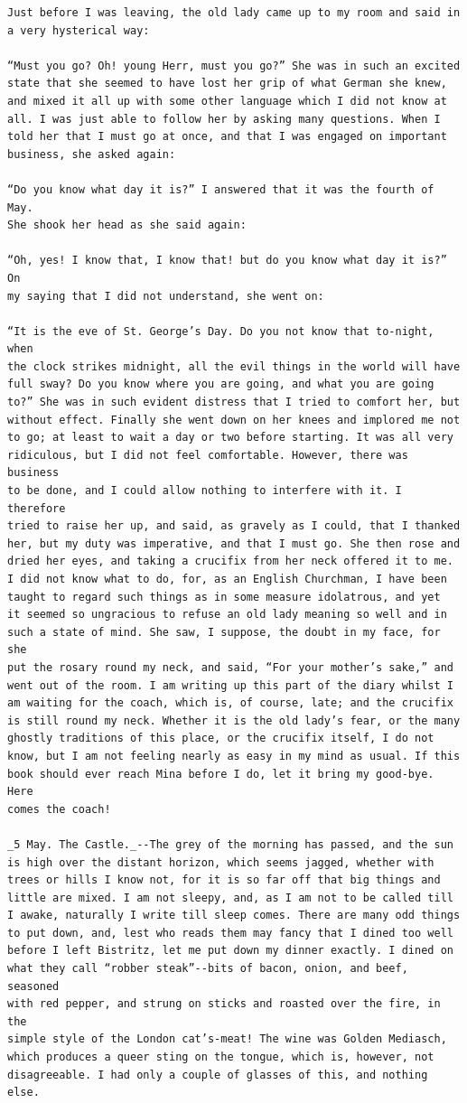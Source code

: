 \documentclass{article}
\begin{document}
\begin{verbatim}
Just before I was leaving, the old lady came up to my room and said in
a very hysterical way:

“Must you go? Oh! young Herr, must you go?” She was in such an excited
state that she seemed to have lost her grip of what German she knew,
and mixed it all up with some other language which I did not know at
all. I was just able to follow her by asking many questions. When I
told her that I must go at once, and that I was engaged on important
business, she asked again:

“Do you know what day it is?” I answered that it was the fourth of May.
She shook her head as she said again:

“Oh, yes! I know that, I know that! but do you know what day it is?” On
my saying that I did not understand, she went on:

“It is the eve of St. George’s Day. Do you not know that to-night, when
the clock strikes midnight, all the evil things in the world will have
full sway? Do you know where you are going, and what you are going
to?” She was in such evident distress that I tried to comfort her, but
without effect. Finally she went down on her knees and implored me not
to go; at least to wait a day or two before starting. It was all very
ridiculous, but I did not feel comfortable. However, there was business
to be done, and I could allow nothing to interfere with it. I therefore
tried to raise her up, and said, as gravely as I could, that I thanked
her, but my duty was imperative, and that I must go. She then rose and
dried her eyes, and taking a crucifix from her neck offered it to me.
I did not know what to do, for, as an English Churchman, I have been
taught to regard such things as in some measure idolatrous, and yet
it seemed so ungracious to refuse an old lady meaning so well and in
such a state of mind. She saw, I suppose, the doubt in my face, for she
put the rosary round my neck, and said, “For your mother’s sake,” and
went out of the room. I am writing up this part of the diary whilst I
am waiting for the coach, which is, of course, late; and the crucifix
is still round my neck. Whether it is the old lady’s fear, or the many
ghostly traditions of this place, or the crucifix itself, I do not
know, but I am not feeling nearly as easy in my mind as usual. If this
book should ever reach Mina before I do, let it bring my good-bye. Here
comes the coach!

_5 May. The Castle._--The grey of the morning has passed, and the sun
is high over the distant horizon, which seems jagged, whether with
trees or hills I know not, for it is so far off that big things and
little are mixed. I am not sleepy, and, as I am not to be called till
I awake, naturally I write till sleep comes. There are many odd things
to put down, and, lest who reads them may fancy that I dined too well
before I left Bistritz, let me put down my dinner exactly. I dined on
what they call “robber steak”--bits of bacon, onion, and beef, seasoned
with red pepper, and strung on sticks and roasted over the fire, in the
simple style of the London cat’s-meat! The wine was Golden Mediasch,
which produces a queer sting on the tongue, which is, however, not
disagreeable. I had only a couple of glasses of this, and nothing else.


\end{verbatim}
\end{document}
